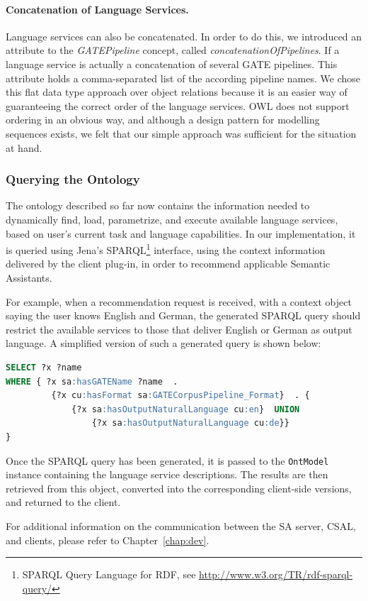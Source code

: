 \paragraph{Concatenation of Language Services.}
Language services can also be concatenated. In order to do this, we
introduced an attribute to the \emph{GATEPipeline} concept, called
\emph{concatenationOfPipelines}. If a language service is actually a
concatenation of several GATE pipelines. This attribute holds a
comma-separated list of the according pipeline names. We chose this
flat data type approach over object relations because it is an easier
way of guaranteeing the correct order of the language services. OWL
does not support ordering in an obvious way, and although a design
pattern for modelling sequences exists, %
we felt that our simple approach was sufficient for the situation at
hand.


\subsubsection{Querying the \sa Ontology}
The ontology described so far now contains the information
needed to dynamically find, load, parametrize, and execute available
language services, based on user's current task and language
capabilities.  In our implementation, it is queried using Jena's
SPARQL\footnote{SPARQL Query Language for RDF, see
  \url{http://www.w3.org/TR/rdf-sparql-query/}} interface, using the
context information delivered by the client plug-in, in order to
recommend applicable Semantic Assistants.

For example, when a recommendation request is received, with a context
object saying the user knows English and German, the generated SPARQL
query should restrict the available services to those that deliver
English or German as output language. A simplified version of such a
generated query is shown below:

\begin{lstlisting}[language=SQL,xleftmargin=8mm,columns=flexible]
SELECT ?x ?name
WHERE { ?x sa:hasGATEName ?name  .
         {?x cu:hasFormat sa:GATECorpusPipeline_Format}  . {
             {?x sa:hasOutputNaturalLanguage cu:en}  UNION 
                 {?x sa:hasOutputNaturalLanguage cu:de}}
}
\end{lstlisting}
Once the SPARQL query has been generated, it is passed to the
\texttt{OntModel} instance containing the language service
descriptions. The results are then retrieved from this object,
converted into the corresponding client-side versions, and returned to
the client.

For additional information on the communication between the SA server,
CSAL, and clients, please refer to Chapter~\ref{chap:dev}.